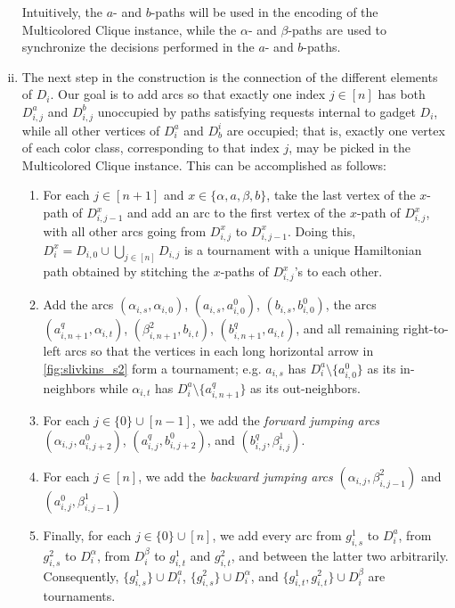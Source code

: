 \documentclass[a4paper,UKenglish,cleveref, autoref, thm-restate]{lipics-v2021}
\newcommand{\pname}[1]{{\sc #1}}
\begin{document}
\begin{enumerate}[(i)]
    Intuitively, the $a$- and $b$-paths will be used in the encoding of the
    \pname{Multicolored Clique} instance, while the $\alpha$- and $\beta$-paths are
    used to synchronize the decisions performed in the $a$- and $b$-paths.
  \item The next step in the construction is the connection of the different elements of
    $D_i$. Our goal is to add arcs so that exactly one index $j \in [n]$ has both
    $D^a_{i,j}$ and $D^b_{i,j}$ unoccupied by paths satisfying requests internal to
    gadget $D_i$, while all other vertices of $D^a_i$ and $D_b^i$ are occupied; that is,
    exactly one vertex of each color class, corresponding to that index $j$, may be
    picked in the \pname{Multicolored Clique} instance. This can be accomplished as follows:
    \begin{enumerate}
      \item For each $j \in [n+1]$ and $x \in \{\alpha, a, \beta, b\}$, take the last
        vertex of the $x$-path of $D_{i,j-1}^x$
        and add an arc to the first vertex of the $x$-path of $D_{i,j}^x$, with all other
        arcs going from $D_{i,j}^x$ to $D_{i,j-1}^x$. Doing this, $D_i^x = D_{i,0} \cup
        \bigcup_{j \in [n]} D_{i,j}$ is a tournament with a unique Hamiltonian path
        obtained by stitching the $x$-paths of $D_{i,j}^x$'s to each other.
      \item Add the arcs $(\alpha_{i,s}, \alpha_{i,0})$, $(a_{i,s}, a^0_{i,0})$,
        $(b_{i,s}, b^0_{i,0})$, the arcs $(a^q_{i,n+1}, \alpha_{i,t})$, $(\beta^2_{i,n+1},
        b_{i,t})$, $(b^q_{i,n+1}, a_{i,t})$, and all remaining right-to-left arcs so that
        the vertices in each long horizontal arrow in \autoref{fig:slivkins_s2} form a
        tournament; e.g. $a_{i,s}$ has $D_i^a \setminus \{a^0_{i,0}\}$ as its
        in-neighbors while $\alpha_{i,t}$ has $D_i^a \setminus \{a^q_{i, n+1}\}$ as
        its out-neighbors.
      \item For each $j \in \{0\} \cup [n-1]$, we add the \textit{forward jumping arcs}
        $(\alpha_{i,j}, a^0_{i,
        j+2})$, $(a^q_{i,j}, b^0_{i,j+2})$, and $(b^q_{i,j}, \beta^1_{i,j})$.
      \item For each $j \in [n]$, we add the \textit{backward jumping arcs}
        $(\alpha_{i,j}, \beta^2_{i,j-1})$ and $(a^0_{i,j}, \beta^1_{i,j-1})$
      \item Finally, for each $j \in \{0\} \cup [n]$, we add every arc from
        $g^1_{i,s}$ to $D^a_{i}$, from $g^2_{i,s}$ to $D^\alpha_{i}$, from
        $D^\beta_i$ to $g^1_{i,t}$ and $g^2_{i,t}$, and between the latter two arbitrarily.
        Consequently, $\{g^1_{i,s}\} \cup D^a_{i}$, $\{g^2_{i,s}\} \cup D^\alpha_{i}$,
        and $\{g^1_{i,t}, g^2_{i,t}\} \cup D^\beta_{i}$ are tournaments.
    \end{enumerate}


\end{enumerate}
\end{document}
